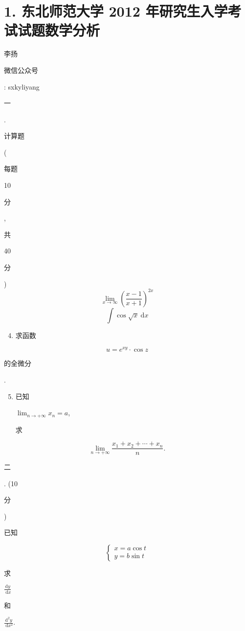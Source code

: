 \documentclass[10pt]{article}
\begin{document}
\section{1. 东北师范大学 2012 年研究生入学考试试题数学分析}
\begin{CJK}{UTF8}{mj}李扬\end{CJK}

\begin{CJK}{UTF8}{mj}微信公众号\end{CJK}: sxkyliyang

\begin{CJK}{UTF8}{mj}一\end{CJK}. \begin{CJK}{UTF8}{mj}计算题\end{CJK} (\begin{CJK}{UTF8}{mj}每题\end{CJK} 10 \begin{CJK}{UTF8}{mj}分\end{CJK}, \begin{CJK}{UTF8}{mj}共\end{CJK} 40 \begin{CJK}{UTF8}{mj}分\end{CJK})
$$
\lim _{x \rightarrow \infty}\left(\frac{x-1}{x+1}\right)^{2 x}
$$
$$
\int \cos \sqrt{x} \mathrm{~d} x
$$

\begin{enumerate}
  \setcounter{enumi}{3}
  \item \begin{CJK}{UTF8}{mj}求函数\end{CJK}
\end{enumerate}
$$
u=e^{x y} \cdot \cos z
$$
\begin{CJK}{UTF8}{mj}的全微分\end{CJK}.

\begin{enumerate}
  \setcounter{enumi}{4}
  \item \begin{CJK}{UTF8}{mj}已知\end{CJK} $\lim _{n \rightarrow+\infty} x_{n}=a$, \begin{CJK}{UTF8}{mj}求\end{CJK}
\end{enumerate}
$$
\lim _{n \rightarrow+\infty} \frac{x_{1}+x_{2}+\cdots+x_{n}}{n} .
$$
\begin{CJK}{UTF8}{mj}二\end{CJK}. (10 \begin{CJK}{UTF8}{mj}分\end{CJK}) \begin{CJK}{UTF8}{mj}已知\end{CJK}
$$
\left\{\begin{array}{l}
x=a \cos t \\
y=b \sin t
\end{array}\right.
$$
\begin{CJK}{UTF8}{mj}求\end{CJK} $\frac{\mathrm{d} y}{\mathrm{~d} x}$ \begin{CJK}{UTF8}{mj}和\end{CJK} $\frac{\mathrm{d}^{2} y}{\mathrm{~d} x^{2}}$.
\end{document}

